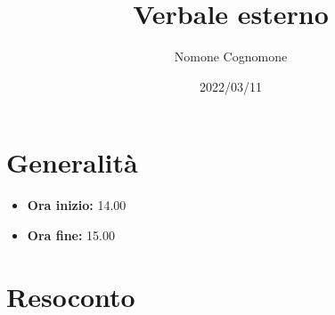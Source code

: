 \documentclass{classes/base}
\title{Verbale esterno}
\date{2022/03/11}
\author{Nomone Cognomone}
\renewcommand{\maketitle}{
    
}
\begin{document}
    \maketitle

    \section{Generalità}
    \begin{itemize}
        \item \textbf{Ora inizio:} 14.00
        \item \textbf{Ora fine:} 15.00
    \end{itemize}

    \section{Resoconto}
\end{document}
